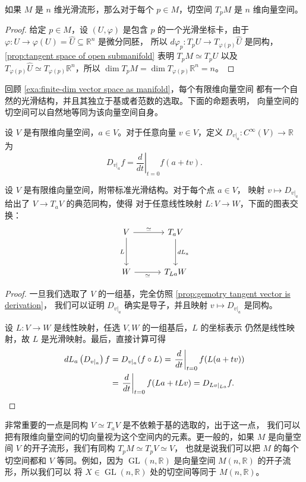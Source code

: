 \documentclass[fontset=none]{Notes}
\DeclareMathOperator\GL{GL}
\begin{document}
\begin{proposition}[切空间的维数]
  如果 $M$ 是 $n$ 维光滑流形，那么对于每个 $p\in M$，切空间 $T_pM$
  是 $n$ 维向量空间。
\end{proposition}
\begin{proof}
  给定 $p\in M$，设 $(U,\varphi)$ 是包含 $p$ 的一个光滑坐标卡，由于
  $\varphi:U\to\varphi(U)=\hat U\subseteq\mathbb{R}^n$ 是微分同胚，
  所以 $d\varphi_p:T_pU\to T_{\varphi(p)}\hat U$ 是同构，
  \autoref{prop:tangent space of open submanifold} 表明 $T_p M\simeq T_pU$
  以及 $T_{\varphi(p)}\hat U\simeq T_{\varphi(p)}\mathbb{R}^n$，所以
  $\dim T_pM=\dim T_{\varphi(p)}\mathbb{R}^n=n$。
\end{proof}

回顾 \autoref{exa:finite-dim vector space as manifold}，每个有限维向量空间
都有一个自然的光滑结构，并且其独立于基或者范数的选取。下面的命题表明，
向量空间的切空间可以自然地等同为该向量空间自身。

设 $V$ 是有限维向量空间，$a\in V$。对于任意向量 $v\in V$，定义
$D_{v|_a}:C^\infty(V)\to\mathbb{R}$ 为
\[
  D_{v|_a}f=\left.\frac{d}{dt}\right|_{t=0}f(a+tv).
\]

\begin{proposition}[向量空间的切空间]
  设 $V$ 是有限维向量空间，附带标准光滑结构。对于每个点 $a\in V$，
  映射 $v\mapsto D_{v|_a}$ 给出了 $V\to T_aV$ 的典范同构，使得
  对于任意线性映射 $L:V\to W$，下面的图表交换：
  \[
    \begin{tikzcd}[sep=3.2em]
      V\arrow[r,"\simeq"]\arrow[d,"L"'] & T_aV\arrow[d,"dL_a"] \\
      W\arrow[r,"\simeq"'] & T_{La}W
    \end{tikzcd}
  \]
\end{proposition}
\begin{proof}
  一旦我们选取了 $V$ 的一组基，完全仿照 \autoref{prop:gemotry tangent vector is derivation}，
  我们可以证明 $D_{v|_a}$ 确实是导子，并且映射 $v\mapsto D_{v|_a}$ 是同构。

  设 $L:V\to W$ 是线性映射，任选 $V,W$ 的一组基后，$L$ 的坐标表示
  仍然是线性映射，故 $L$ 是光滑映射。最后，直接计算可得
  \begin{align*}
    dL_a\left(D_{v|_a}\right)f&=D_{v|_a}(f\circ L)=\left.\frac{d}{dt}\right|_{t=0}
    f(L(a+tv))\\
    &=\left.\frac{d}{dt}\right|_{t=0}f(La+tLv)=D_{Lv|_{La}}f.\qedhere
  \end{align*}
\end{proof}

非常重要的一点是同构 $V\simeq T_aV$ 是不依赖于基的选取的，出于这一点，
我们可以把有限维向量空间的切向量视为这个空间内的元素。更一般的，如果 $M$
是向量空间 $V$ 的开子流形，我们有同构 $T_pM\simeq T_pV\simeq V$，
也就是说我们可以把 $M$ 的每个切空间都和 $V$ 等同。例如，因为
$\GL(n,\mathbb{R})$ 是向量空间 $M(n,\mathbb{R})$ 的开子流形，所以我们可以
将 $X\in\GL(n,\mathbb{R})$ 处的切空间等同于 $M(n,\mathbb{R})$。
\end{document}
